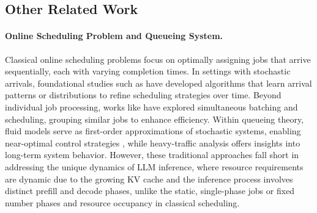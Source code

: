 \subsection{Other Related Work}

\paragraph*{Online Scheduling Problem and Queueing System.} 
Classical online scheduling problems focus on optimally assigning jobs that arrive sequentially, each with varying completion times. In settings with stochastic arrivals, foundational studies such as \cite{devanur2009adwords,vee2010optimal,cole2014sample,balkanski2016power,lattanzi2020online} have developed algorithms that learn arrival patterns or distributions to refine scheduling strategies over time. Beyond individual job processing, works like \cite{im2013online,lucier2013efficient,liu2015online,li2020online} have explored simultaneous batching and scheduling, grouping similar jobs to enhance efficiency. Within queueing theory, fluid models serve as first-order approximations of stochastic systems, enabling near-optimal control strategies \cite{mandelbaum1998strong,maglaras2000discrete,bauerle2002optimal,liu2011network}, while heavy-traffic analysis offers insights into long-term system behavior. However, these traditional approaches fall short in addressing the unique dynamics of LLM inference, where resource requirements are dynamic due to the growing KV cache and the inference process involves distinct prefill and decode phases, unlike the static, single-phase jobs or fixed number phases and resource occupancy in classical scheduling.

